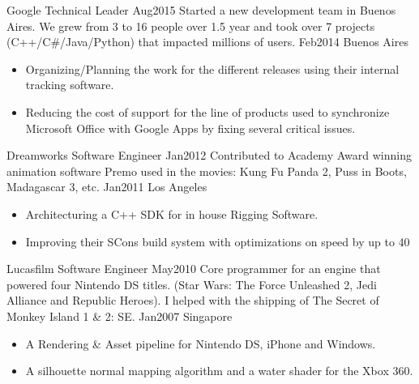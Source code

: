 \begin{experiences}
   \experience
    {Google} 				{Technical Leader}
	{Aug2015} 			{Started a new development team in Buenos Aires. We grew from 3 to 16 people over 1.5 year and took over 7 projects (C++/C\#/Java/Python) that impacted millions of users.}
	{Feb2014}	 	
	{Buenos Aires}			{
						  \begin{itemize}
							\item Organizing/Planning the work for the different releases using their internal tracking software.
							\item Reducing the cost of support for the line of products used to synchronize Microsoft Office with Google Apps by fixing several critical issues.
						  \end{itemize}
						 }
   \emptySeparator
   
   \experience
    {Dreamworks} 			{Software Engineer}
    {Jan2012} 				{Contributed to Academy Award winning animation software Premo used in the movies: Kung Fu Panda 2, Puss in Boots, Madagascar 3, etc.}
	{Jan2011}	 	
	{Los Angeles}			{
						  \begin{itemize}
							\item Architecturing a C++ SDK for in house Rigging Software.
							\item Improving their SCons build system with optimizations on speed by up to 40%
						  \end{itemize}
						 }
   \emptySeparator
   
   \experience
    {Lucasfilm} 			{Software Engineer}
    {May2010} 				{Core programmer for an engine that powered four Nintendo DS titles. (Star Wars: The Force Unleashed 2, Jedi Alliance and Republic Heroes). I helped with the shipping of The Secret of Monkey Island 1 \& 2: SE.}
	{Jan2007}	 	
	{Singapore}			{
						  \begin{itemize}
							\item A Rendering \& Asset pipeline for Nintendo DS, iPhone and Windows.
							\item A silhouette normal mapping algorithm and a water shader for the Xbox 360.
						  \end{itemize}
						 }
  
\end{experiences}

